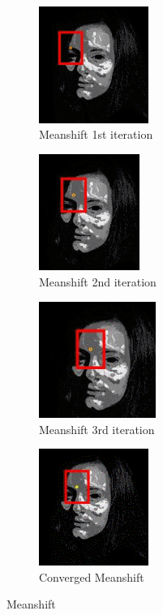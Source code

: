 \documentclass[11pt,a4paper]{article}
\begin{document}
\begin{itemize}
 \begin{figure}[h!]
 \begin{subfigure}{0.5\textwidth}
\includegraphics[width=0.9\linewidth, height=3.8cm]{msi.png} 
\caption{Meanshift 1st iteration}
\end{subfigure}
\begin{subfigure}{0.5\textwidth}
\includegraphics[width=0.9\linewidth, height=3.8cm]{ms2nd.png}
\caption{Meanshift 2nd iteration}
\end{subfigure}
\begin{subfigure}{0.5\textwidth}
\includegraphics[width=0.9\linewidth, height=3.8cm]{ms3rd.png}
\caption{Meanshift 3rd iteration}
\end{subfigure}
\begin{subfigure}{0.5\textwidth}
\includegraphics[width=0.9\linewidth, height=3.8cm]{msconverged.png} 
\caption{Converged  Meanshift}
\end{subfigure}
 \caption{Meanshift}

\end{figure}
\end{itemize}
\end{document}
